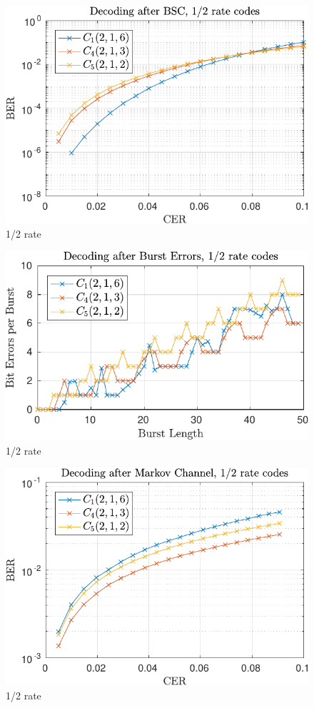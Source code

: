 
\begin{figure}
\centering
\includegraphics[scale=1]{../figures/extra12rand.pdf} 
\caption{1/2 rate}
\end{figure}

\begin{figure}
\centering
\includegraphics[scale=1]{../figures/extra12burst.pdf} 
\caption{1/2 rate}
\end{figure}

\begin{figure}
\centering
\includegraphics[scale=1]{../figures/extra12markov.pdf} 
\caption{1/2 rate}
\end{figure}